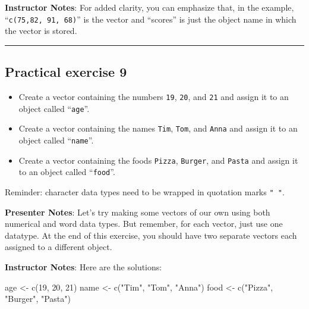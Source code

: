 \documentclass[
  letterpaper,
  DIV=11,
  numbers=noendperiod]{scrartcl}
\newenvironment{Shaded}{\begin{snugshade}}{\end{snugshade}}
\newcommand{\DecValTok}[1]{\textcolor[rgb]{0.68,0.00,0.00}{#1}}
\newcommand{\FunctionTok}[1]{\textcolor[rgb]{0.28,0.35,0.67}{#1}}
\newcommand{\NormalTok}[1]{\textcolor[rgb]{0.00,0.23,0.31}{#1}}
\newcommand{\OtherTok}[1]{\textcolor[rgb]{0.00,0.23,0.31}{#1}}
\newcommand{\StringTok}[1]{\textcolor[rgb]{0.13,0.47,0.30}{#1}}
\begin{document}
\textbf{Instructor Notes}: For added clarity, you can emphasize that, in
the example, ``\texttt{c(75,82,\ 91,\ 68)}'' is the vector and
``scores'' is just the object name in which the vector is stored.

\begin{center}\rule{0.5\linewidth}{0.5pt}\end{center}

\subsection{Practical exercise 9}\label{practical-exercise-9}

\begin{itemize}
\item[$\square$]
  Create a vector containing the numbers \texttt{19}, \texttt{20}, and
  \texttt{21} and assign it to an object called ``\texttt{age}''.
\item[$\square$]
  Create a vector containing the names \texttt{Tim}, \texttt{Tom}, and
  \texttt{Anna} and assign it to an object called ``\texttt{name}''.
\item[$\square$]
  Create a vector containing the foods \texttt{Pizza}, \texttt{Burger},
  and \texttt{Pasta} and assign it to an object called
  ``\texttt{food}''.
\end{itemize}

\begin{tcolorbox}[enhanced jigsaw, arc=.35mm, bottomrule=.15mm, bottomtitle=1mm, breakable, colback=white, colbacktitle=quarto-callout-tip-color!10!white, colframe=quarto-callout-tip-color-frame, coltitle=black, left=2mm, leftrule=.75mm, opacityback=0, opacitybacktitle=0.6, rightrule=.15mm, title=\textcolor{quarto-callout-tip-color}{\faLightbulb}\hspace{0.5em}{Character data type}, titlerule=0mm, toprule=.15mm, toptitle=1mm]

Reminder: character data types need to be wrapped in quotation marks
\texttt{"\ "}.

\end{tcolorbox}

\textbf{Presenter Notes}: Let's try making some vectors of our own using
both numerical and word data types. But remember, for each vector, just
use one datatype. At the end of this exercise, you should have two
separate vectors each assigned to a different object.

\textbf{Instructor Notes}: Here are the solutions:

\begin{Shaded}
\begin{Highlighting}[]
\NormalTok{age }\OtherTok{\textless{}{-}} \FunctionTok{c}\NormalTok{(}\DecValTok{19}\NormalTok{, }\DecValTok{20}\NormalTok{, }\DecValTok{21}\NormalTok{)}
\NormalTok{name }\OtherTok{\textless{}{-}} \FunctionTok{c}\NormalTok{(}\StringTok{"Tim"}\NormalTok{, }\StringTok{"Tom"}\NormalTok{, }\StringTok{"Anna"}\NormalTok{)}
\NormalTok{food }\OtherTok{\textless{}{-}} \FunctionTok{c}\NormalTok{(}\StringTok{"Pizza"}\NormalTok{, }\StringTok{"Burger"}\NormalTok{, }\StringTok{"Pasta"}\NormalTok{)}
\end{Highlighting}
\end{Shaded}
\end{document}
